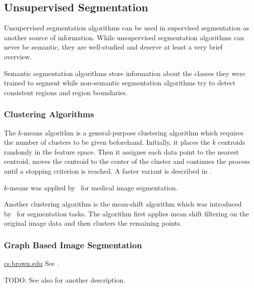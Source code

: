 
\subsection{Unsupervised Segmentation}%
\label{subsec:unsupervised-traditional-segmentation}%

Unsupervised segmentation algorithms can be used in supervised segmentation as
another source of information. While unsupervised segmentation algorithms can
never be semantic, they are well-studied and deserve at least a very brief
overview.

Semantic segmentation algorithms store information about the classes they were
trained to segment while non-semantic segmentation algorithms try to detect
consistent regions and region boundaries.

\subsubsection{Clustering Algorithms}
The $k$-means algorithm is a general-purpose clustering algorithm which
requires the number of clusters to be given beforehand. Initially, it places
the $k$ centroids randomly in the feature space. Then it assignes each
data point to the nearest centroid, moves the centroid to the center of the
cluster and continues the process until a stopping criterion is reached. A
faster variant is described in \cite{hartigan1975clustering}.

$k$-means was applied by~\cite{chen1998image} for medical image segmentation.

Another clustering algorithm is the mean-shift algorithm which was introduced
by~\cite{comaniciu2002mean} for segmentation tasks. The algorithm first applies
mean shift filtering on the original image data and then clusters the remaining
points.



\subsubsection{Graph Based Image Segmentation}%
\label{subsec:graph-based-image-segmentation}%
\href{http://cs.brown.edu/~pff/segment/}{cs.brown.edu}
See \cite{felzenszwalb2004efficient}.

TODO: See also \cite{pantofaru2005comparison} for another description.

